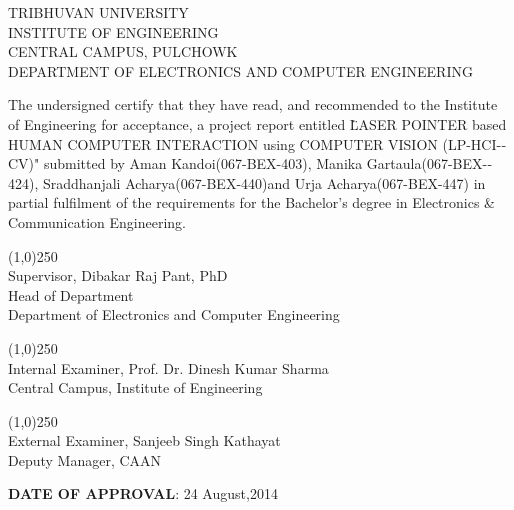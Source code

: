 
    
      \vspace{1cm}  
      \begin{center} 
       TRIBHUVAN UNIVERSITY \\
        INSTITUTE OF ENGINEERING \\
        CENTRAL CAMPUS, PULCHOWK\\
        DEPARTMENT OF ELECTRONICS AND COMPUTER ENGINEERING\\
       \end{center}
       
        \vspace{1cm}
        
        The undersigned certify that they have read, and recommended to the Institute of
Engineering for acceptance, a project report entitled \"LASER POINTER based HUMAN­ COMPUTER INTERACTION using COMPUTER VISION (LP-­HCI-­CV)" submitted by Aman Kandoi(067­-BEX­-403), 
Manika Gartaula(067­-BEX-­424), 
Sraddhanjali Acharya(067-­BEX­-440)and 
Urja Acharya(067­-BEX­-447) in partial fulfilment of the requirements for the Bachelor's degree in Electronics \& Communication Engineering.

		\vspace{1cm}
		\begin{flushleft}
		
        \line(1,0){250}\\
		Supervisor, Dibakar Raj Pant, PhD\\
		Head of Department\\
		Department of Electronics and Computer Engineering\\
		\vspace{1cm}
		
		\line(1,0){250}\\
		Internal Examiner, Prof. Dr. Dinesh Kumar Sharma\\
		Central Campus, Institute of Engineering\\
		\vspace{1cm}
		
		\line(1,0){250}\\
		External Examiner, Sanjeeb Singh Kathayat\\
		Deputy Manager, CAAN
		\end{flushleft}
		
		\vspace{1cm}
		\textbf{DATE OF APPROVAL}: 24 August,2014    
        
        
        
    


        
        
    
